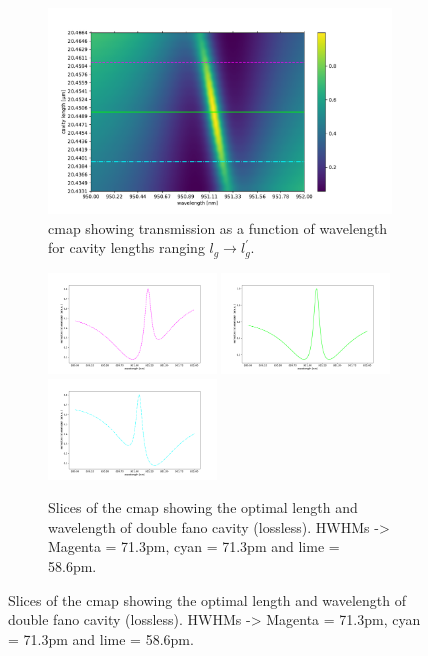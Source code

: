 \begin{figure}
    \centering
    \begin{subfigure}[c]{0.49\textwidth}
        \centering
        \includegraphics[width=\textwidth]{figures/cmap_with_slice_indicators1.pdf}
        \caption{cmap showing transmission as a function of wavelength for cavity lengths ranging $l_{g} \rightarrow l_{g}^{\prime}$.}
    \end{subfigure}
    \begin{subfigure}[c]{0.49\textwidth}
        \centering
        \includegraphics[width=0.49\textwidth]{figures/cmap_slice2.pdf}
        \newline
        \includegraphics[width=0.49\textwidth]{figures/cmap_slice1.pdf}
        \includegraphics[width=0.49\textwidth]{figures/cmap_slice3.pdf}
        \caption{Slices of the cmap showing the optimal length and wavelength of double fano cavity (lossless). HWHMs -> Magenta = 71.3pm, cyan = 71.3pm and lime = 58.6pm.}
    \end{subfigure}
\end{figure}

